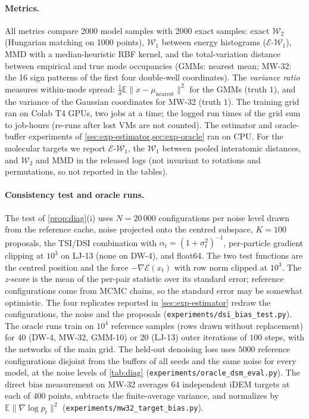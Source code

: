 \paragraph{Metrics.}
All metrics compare 2000 model samples with 2000 exact samples: exact $\mathcal{W}_2$ (Hungarian matching on 1000 points), $\mathcal{W}_1$ between energy histograms ($\mathcal{E}$-$\mathcal{W}_1$), MMD with a median-heuristic RBF kernel, and the total-variation distance between empirical and true mode occupancies (GMMs: nearest mean; MW-32: the 16 sign patterns of the first four double-well coordinates).
The \emph{variance ratio} measures within-mode spread: $\frac{1}{d}\mathbb{E}\|x-\mu_{\mathrm{nearest}}\|^2$ for the GMMs (truth $1$), and the variance of the Gaussian coordinates for MW-32 (truth $1$).
The training grid ran on Colab T4 GPUs, two jobs at a time; the logged run times of the grid sum to  job-hours (re-runs after lost VMs are not counted). The estimator and oracle-buffer experiments of \cref{sec:exp-estimator,sec:exp-oracle} ran on CPU. For the molecular targets we report $\mathcal{E}$-$\mathcal{W}_1$, the $\mathcal{W}_1$ between pooled interatomic distances, and $\mathcal{W}_2$ and MMD in the released logs (not invariant to rotations and permutations, so not reported in the tables).

\paragraph{Consistency test and oracle runs.}
The test of \cref{prop:diag}(i) uses $N=20\,000$ configurations per noise level drawn from the reference cache, noise projected onto the centred subspace, $K=100$ proposals, the TSI/DSI combination with $\alpha_t=(1+\sigma_t^2)^{-1}$, per-particle gradient clipping at $10^3$ on LJ-13 (none on DW-4), and float64. The two test functions are the centred position and the force $-\nabla\mathcal{E}(x_t)$ with row norm clipped at $10^3$. The $z$-score is the mean of the per-pair statistic over its standard error; reference configurations come from MCMC chains, so the standard error may be somewhat optimistic. The four replicates reported in \cref{sec:exp-estimator} redraw the configurations, the noise and the proposals (\texttt{experiments/dsi\_bias\_test.py}).
The oracle runs train on $10^4$ reference samples (rows drawn without replacement) for $40$ (DW-4, MW-32, GMM-10) or $20$ (LJ-13) outer iterations of $100$ steps, with the networks of the main grid. The held-out denoising loss uses $5000$ reference configurations disjoint from the buffers of all seeds and the same noise for every model, at the noise levels of \cref{tab:diag} (\texttt{experiments/oracle\_dsm\_eval.py}). The direct bias measurement on MW-32 averages $64$ independent iDEM targets at each of $400$ points, subtracts the finite-average variance, and normalizes by $\mathbb{E}\|\nabla\log p_t\|^2$ (\texttt{experiments/mw32\_target\_bias.py}).
